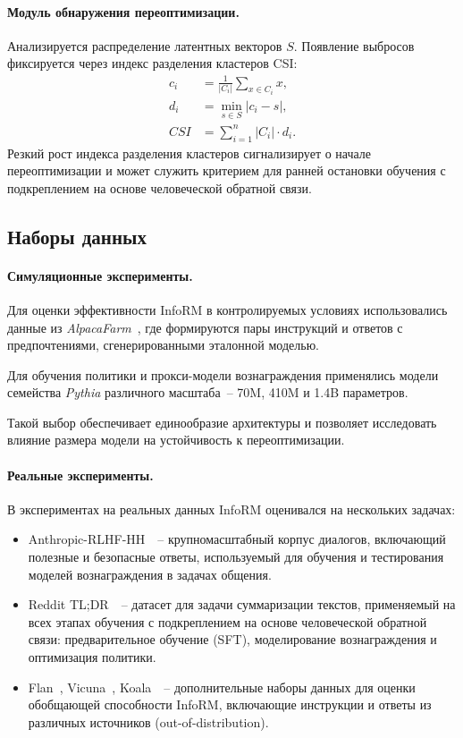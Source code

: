 \paragraph{Модуль обнаружения переоптимизации.}
Анализируется распределение латентных векторов $S$.
Появление выбросов фиксируется через индекс разделения кластеров CSI:
\begin{equation}
\begin{aligned}
c_i &= \frac{1}{|C_i|} \sum_{x \in C_i} x, \\
d_i &= \min_{s \in S} | c_i - s |, \\
CSI &= \sum_{i=1}^{n} |C_i| \cdot d_i.
\end{aligned}
\end{equation}
Резкий рост индекса разделения кластеров сигнализирует о начале переоптимизации и может служить критерием для ранней остановки обучения с подкреплением на основе человеческой обратной связи.

\subsection{Наборы данных}

\paragraph{Симуляционные эксперименты.} Для оценки эффективности InfoRM в контролируемых условиях использовались данные из \emph{AlpacaFarm}~\cite{dubois2023alpacafarm}, где формируются пары инструкций и ответов с предпочтениями, сгенерированными эталонной моделью.  

Для обучения политики и прокси-модели вознаграждения применялись модели семейства \emph{Pythia} различного масштаба~-- 70M, 410M и 1.4B параметров. 


Такой выбор обеспечивает единообразие архитектуры и позволяет исследовать влияние размера модели на устойчивость к переоптимизации.

\paragraph{Реальные эксперименты.} В экспериментах на реальных данных InfoRM оценивался на нескольких задачах:

\begin{itemize}
    \item Anthropic-RLHF-HH~\cite{anthropic_hh_rlhf}~-- крупномасштабный корпус диалогов, включающий полезные и безопасные  ответы, используемый для обучения и тестирования моделей вознаграждения в задачах общения.  
    \item Reddit TL;DR~\cite{trl_tldr}~-- датасет для задачи суммаризации текстов, применяемый на всех этапах обучения с подкреплением на основе человеческой обратной связи: предварительное обучение (SFT), моделирование вознаграждения и оптимизация политики.  
    \item Flan~\cite{openorca_flan}, Vicuna~\cite{vicuna2023}, Koala~\cite{koala2023}~-- дополнительные наборы данных для оценки обобщающей способности InfoRM, включающие инструкции и ответы из различных источников (out-of-distribution).  
\end{itemize}



